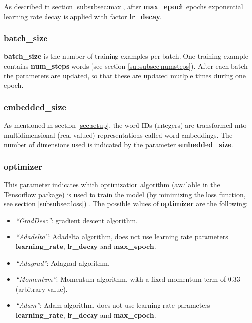 \documentclass[10pt,a4paper,titlepage]{article}
\begin{document}
As described in section \ref{subsubsec:max}, after \textbf{max\_epoch} epochs exponential learning rate decay is applied with factor \textbf{lr\_decay}.

\subsubsection{batch\_size}

\textbf{batch\_size} is the number of training examples per batch. One training example contains \textbf{num\_steps} words (see section \ref{subsubsec:numsteps}). After each batch the parameters are updated, so that these are updated mutiple times during one epoch.

\subsubsection{embedded\_size}

As mentioned in section \ref{sec:setup}, the word IDs (integers) are transformed into multidimensional (real-valued) representations called word embeddings. The number of dimensions used is indicated by the parameter \textbf{embedded\_size}.

\subsubsection{optimizer}
\label{subsubsec:opt}

This parameter indicates which optimization algorithm (available in the Tensorflow package) is used to train the model (by minimizing the loss function, see section \ref{subsubsec:loss}) \cite{opt}. The possible values of \textbf{optimizer} are the following:

\begin{itemize}

	\item \textit{``GradDesc''}: gradient descent algorithm.
	\item \textit{``Adadelta''}: Adadelta algorithm, does not use learning rate parameters \textbf{learning\_rate}, \textbf{lr\_decay} and \textbf{max\_epoch}.
	\item \textit{``Adagrad''}: Adagrad algorithm.
	\item \textit{``Momentum''}: Momentum algorithm, with a fixed momentum term of 0.33 (arbitrary value).
	\item \textit{``Adam''}: Adam algorithm, does not use learning rate parameters \textbf{learning\_rate}, \textbf{lr\_decay} and \textbf{max\_epoch}.	

\end{itemize}
\end{document}
